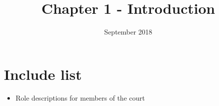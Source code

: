 \documentclass{article}
\title{Chapter 1 - Introduction}
\date{September 2018}
\begin{document}
\section{Include list}
\begin{itemize}
\item Role descriptions for members of the court
\end{itemize}
\end{document}
